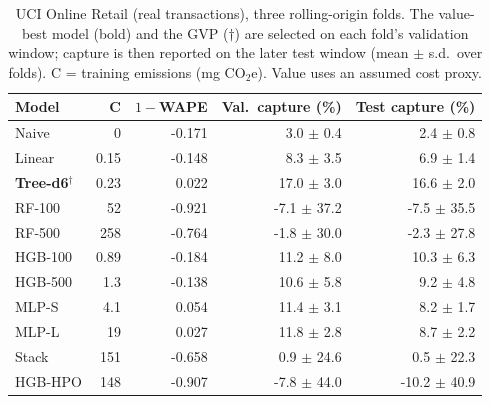 \begin{table}[t]
\centering
\caption{UCI Online Retail (real transactions), three rolling-origin folds. The value-best model (bold) and the GVP ($\dagger$) are selected on each fold's validation window; capture is then reported on the later test window (mean $\pm$ s.d.\ over folds). C = training emissions (mg CO$_2$e). Value uses an assumed cost proxy.}
\label{tab:retailreal}
\scriptsize
\setlength{\tabcolsep}{3pt}
\begin{tabular}{lrrrr}
\toprule
Model & C & $1-$WAPE & Val.\ capture (\%) & Test capture (\%) \\ \midrule
Naive & 0 & -0.171 & 3.0 $\pm$ 0.4 & 2.4 $\pm$ 0.8 \\
Linear & 0.15 & -0.148 & 8.3 $\pm$ 3.5 & 6.9 $\pm$ 1.4 \\
\textbf{Tree-d6}$^\dagger$ & 0.23 & 0.022 & 17.0 $\pm$ 3.0 & 16.6 $\pm$ 2.0 \\
RF-100 & 52 & -0.921 & -7.1 $\pm$ 37.2 & -7.5 $\pm$ 35.5 \\
RF-500 & 258 & -0.764 & -1.8 $\pm$ 30.0 & -2.3 $\pm$ 27.8 \\
HGB-100 & 0.89 & -0.184 & 11.2 $\pm$ 8.0 & 10.3 $\pm$ 6.3 \\
HGB-500 & 1.3 & -0.138 & 10.6 $\pm$ 5.8 & 9.2 $\pm$ 4.8 \\
MLP-S & 4.1 & 0.054 & 11.4 $\pm$ 3.1 & 8.2 $\pm$ 1.7 \\
MLP-L & 19 & 0.027 & 11.8 $\pm$ 2.8 & 8.7 $\pm$ 2.2 \\
Stack & 151 & -0.658 & 0.9 $\pm$ 24.6 & 0.5 $\pm$ 22.3 \\
HGB-HPO & 148 & -0.907 & -7.8 $\pm$ 44.0 & -10.2 $\pm$ 40.9 \\
\bottomrule
\end{tabular}
\end{table}

